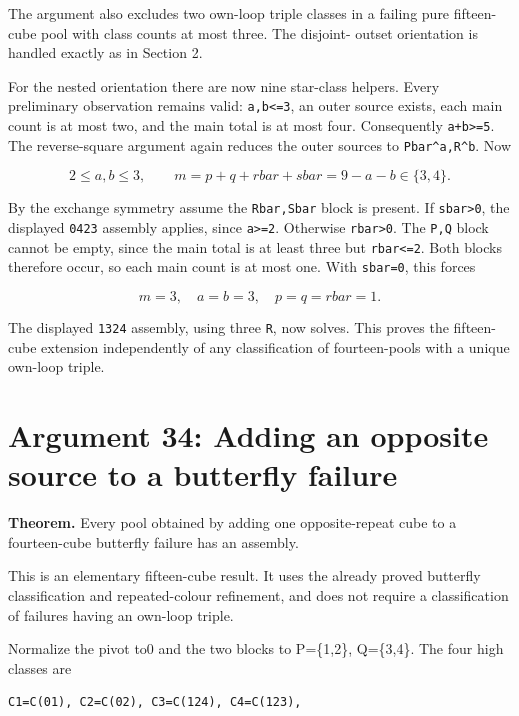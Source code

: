 \documentclass[
  10pt,
]{article}
\begin{document}
The argument also excludes two own-loop triple classes in a failing pure
fifteen-cube pool with class counts at most three. The disjoint- outset
orientation is handled exactly as in Section 2.

For the nested orientation there are now nine star-class helpers. Every
preliminary observation remains valid: \texttt{a,b\textless{}=3}, an
outer source exists, each main count is at most two, and the main total
is at most four. Consequently \texttt{a+b\textgreater{}=5}. The
reverse-square argument again reduces the outer sources to
\texttt{Pbar\^{}a,R\^{}b}. Now

\[
2\le a,b\le3,\qquad
m=p+q+rbar+sbar=9-a-b\in\{3,4\}.
\]

By the exchange symmetry assume the \texttt{Rbar,Sbar} block is present.
If \texttt{sbar\textgreater{}0}, the displayed \texttt{04\textbar{}23}
assembly applies, since \texttt{a\textgreater{}=2}. Otherwise
\texttt{rbar\textgreater{}0}. The \texttt{P,Q} block cannot be empty,
since the main total is at least three but \texttt{rbar\textless{}=2}.
Both blocks therefore occur, so each main count is at most one. With
\texttt{sbar=0}, this forces

\[
m=3,\quad a=b=3,\quad p=q=rbar=1.
\]

The displayed \texttt{13\textbar{}24} assembly, using three \texttt{R},
now solves. This proves the fifteen-cube extension independently of any
classification of fourteen-pools with a unique own-loop triple.

\hypertarget{arg-34}{%
\section{Argument 34: Adding an opposite source to a butterfly
failure}\label{arg-34}}

\textbf{Theorem.} Every pool obtained by adding one opposite-repeat cube
to a fourteen-cube butterfly failure has an assembly.

This is an elementary fifteen-cube result. It uses the already proved
butterfly classification and repeated-colour refinement, and does not
require a classification of failures having an own-loop triple.

Normalize the pivot to0 and the two blocks to P=\{1,2\}, Q=\{3,4\}. The
four high classes are

\begin{verbatim}
C1=C(01), C2=C(02), C3=C(124), C4=C(123),
\end{verbatim}
\end{document}
